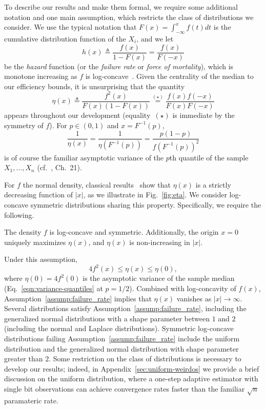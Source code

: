 To describe our results and make them formal, we require some additional
notation and one main assumption, which restricts the class of distributions
we consider.  We use the typical notation that
$F(x) = \int_{-\infty}^x f(t) dt$ is the cumulative distribution function
of the $X_i$, and we let
\begin{equation*}
  h(x) \triangleq \frac{f(x)}{1-F(x)} = \frac{f(x)}{F(-x)}
\end{equation*}
be the \emph{hazard} function (or the \emph{failure rate} or \emph{force of
  mortality}), which is monotone increasing as $f$ is
log-concave~\cite{bagnoli2005log}. Given the centrality of the median
to our efficiency bounds, it is unsurprising that the quantity
\begin{equation}
  \label{eq:eta_def}
  \eta(x) \triangleq \frac{f^2(x)}{F(x)(1-F(x))}
  \stackrel{(\star)}{=} \frac{f(x)f(-x)}{F(x)F(-x)}
\end{equation}
appears throughout our development (equality~$(\star)$ is immediate by
the symmetry of $f$). For $p \in (0, 1)$ and $x = F^{-1}(p)$,
\begin{equation}
  \label{eqn:variance-quantiles}
  \frac{1}{\eta(x)} =
  \frac{1}{\eta(F^{-1}(p))}
  = \frac{p (1 - p)}{f(F^{-1}(p))^2}
\end{equation}
is of course the familiar asymptotic variance of the $p$th quantile of the sample $X_1,\ldots,X_n$ (cf.~\cite{VanDerVaart98}, Ch.~21).

For $f$ the normal density, classical results~\cite{Samford1953,
  hammersley1950estimating} show that $\eta(x)$ is a strictly
decreasing function of $|x|$, as we illustrate in Fig.~\ref{fig:eta}.
%
We consider log-concave symmetric distributions sharing this
property.  Specifically, we require the following.
\begin{assumption}
  \label{assump:failure_rate}
  The density $f$ is log-concave and symmetric.  Additionally, the origin $x
  = 0$ uniquely maximizes $\eta(x)$, and $\eta(x)$ is non-increasing in
  $|x|$.
\end{assumption}
Under this assumption,
\begin{equation*}
  4 f^2(x) \leq \eta(x) \leq \eta(0),
\end{equation*} 
%
where $\eta(0) = 4 f^2(0)$ is the asymptotic variance of the sample median
(Eq.~\eqref{eqn:variance-quantiles} at $p = 1/2$).  Combined with
log-concavity of $f(x)$, Assumption~\ref{assump:failure_rate} implies that
$\eta(x)$ vanishes as $|x|\rightarrow \infty$.  Several distributions
satisfy Assumption~\ref{assump:failure_rate}, including the generalized
normal distributions with a shape parameter between $1$ and $2$ (including
the normal and Laplace distributions). Symmetric log-concave distributions
failing Assumption~\ref{assump:failure_rate} include the uniform
distribution and the generalized normal distribution with shape parameter
greater than $2$. Some restriction on the class of distributions is
necessary to develop our results; indeed, in
Appendix~\ref{sec:uniform-weirdos} we provide a brief discussion on the
uniform distribution, where a one-step adaptive estimator with single bit
observations can achieve convergence rates faster than the familiar
$\sqrt{n}$ paramateric rate.

